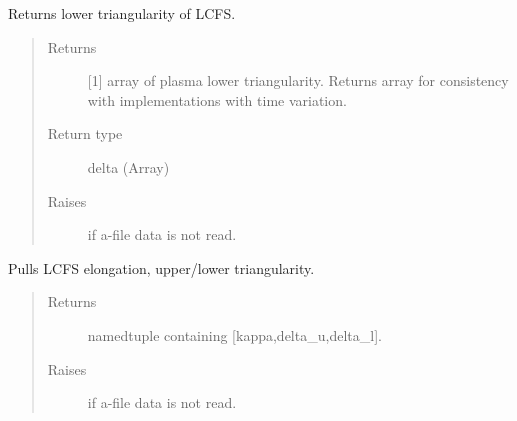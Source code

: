 \documentclass[letterpaper,10pt,english]{sphinxmanual}
\begin{document}
\begin{fulllineitems}
\begin{fulllineitems}
\begin{quote}
\begin{description}
\end{description}\end{quote}

\end{fulllineitems}


\begin{fulllineitems}
\label{\detokenize{eqtools:eqtools.eqdskreader.EqdskReader.getLowerTriangularity}}
Returns lower triangularity of LCFS.
\begin{quote}\begin{description}
\item[{Returns}] \leavevmode
{[}1{]} array of plasma lower triangularity.  Returns
array for consistency with
{\hyperref[\detokenize{eqtools:eqtools.core.Equilibrium}]{}}
implementations with time variation.

\item[{Return type}] \leavevmode
delta (Array)

\item[{Raises}] \leavevmode
{} \textendash{} if a-file data is not read.

\end{description}\end{quote}

\end{fulllineitems}


\begin{fulllineitems}
\label{\detokenize{eqtools:eqtools.eqdskreader.EqdskReader.getShaping}}
Pulls LCFS elongation, upper/lower triangularity.
\begin{quote}\begin{description}
\item[{Returns}] \leavevmode
namedtuple containing {[}kappa,delta\_u,delta\_l{]}.

\item[{Raises}] \leavevmode
{} \textendash{} if a-file data is not read.


\end{description}
\end{quote}
\end{fulllineitems}
\end{fulllineitems}
\end{document}
